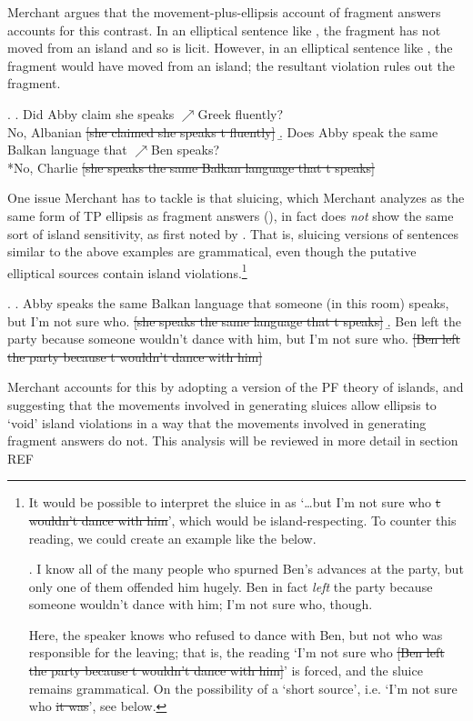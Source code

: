 \documentclass[11pt,letterpaper]{article}
\begin{document}
Merchant argues that the movement-plus-ellipsis account of fragment answers accounts for this contrast. In an elliptical sentence like \Next[a], the fragment has not moved from an island and so is licit. However, in an elliptical sentence like \Next[b], the fragment would have moved from an island; the resultant violation rules out the fragment.

\ex. 	\a. Did Abby claim she speaks $\nearrow$Greek fluently?\\
		No, Albanian \sout{[she claimed she speaks t fluently]}
	\b.  Does Abby speak the same Balkan language that $\nearrow$Ben speaks?\\
		{}*No, Charlie \sout{[she speaks the same Balkan language that t speaks]}
		
One issue Merchant has to tackle is that sluicing, which Merchant analyzes as the same form of TP ellipsis as fragment answers (\cite{Me01}), in fact does \emph{not} show the same sort of island sensitivity, as first noted by \cite{Ro69}. That is, sluicing versions of sentences similar to the above examples are grammatical, even though the putative elliptical sources contain island violations.\footnote{It would be possible to interpret the sluice in \TextNext[b] as `\ldots but I'm not sure who \sout{t wouldn't dance with him}', which would be island-respecting. To counter this reading, we could create an example like the below.
	
	\ex. I know all of the many people who spurned Ben's advances at the party, but only one of them offended him hugely. Ben in fact \emph{left} the party because someone wouldn't dance with him; I'm not sure who, though.
	
	Here, the speaker knows who refused to dance with Ben, but not who was responsible for the leaving; that is, the reading `I'm not sure who \sout{[Ben left the party because t wouldn't dance with him]}' is forced, and the sluice remains grammatical. On the possibility of a `short source', i.e. `I'm not sure who \sout{it was}', see below.}

\ex. 	\a. Abby speaks the same Balkan language that someone (in this room) speaks, but I'm not sure who. \sout{[she speaks the same language that t speaks]}
	\b. Ben left the party because someone wouldn't dance with him, but I'm not sure who. \sout{[Ben left the party because t wouldn't dance with him]}

Merchant accounts for this by adopting a version of the PF theory of islands, and suggesting that the movements involved in generating sluices allow ellipsis to `void' island violations in a way that the movements involved in generating fragment answers do not. This analysis will be reviewed in more detail in section REF %
	
\end{document}
